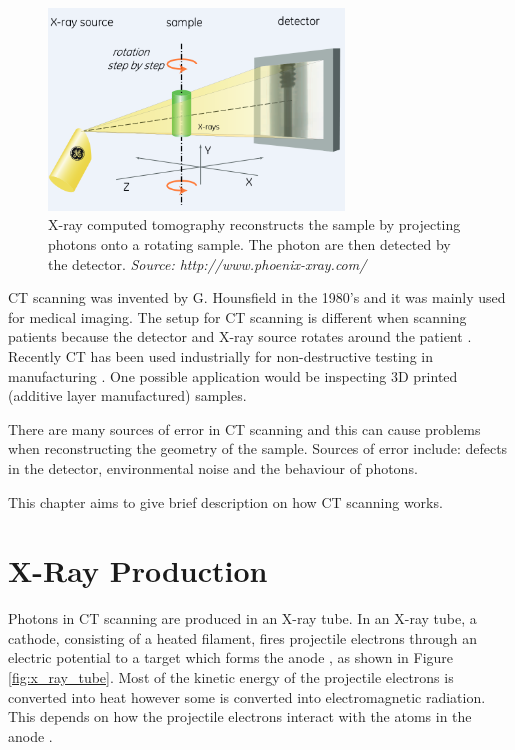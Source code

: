 \documentclass[12pt]{report}
\begin{document}
\begin{figure}
\centering
\includegraphics[width=0.7\textwidth]{figures/x_ray_ct.png}
\caption{X-ray computed tomography reconstructs the sample by projecting photons onto a rotating sample. The photon are then detected by the detector. \emph{Source: http://www.phoenix-xray.com/}}
\label{fig:x_ray_ct}
\end{figure}

CT scanning was invented by G. Hounsfield \cite{hounsfield1980computed} in the 1980's and it was mainly used for medical imaging. The setup for CT scanning is different when scanning patients because the detector and X-ray source rotates around the patient \cite{cantatore2011introduction}. Recently CT has been used industrially for non-destructive testing in manufacturing \cite{cantatore2011introduction}. One possible application would be inspecting 3D printed (additive layer manufactured) samples.

There are many sources of error in CT scanning \cite{cantatore2011introduction} and this can cause problems when reconstructing the geometry of the sample. Sources of error include: defects in the detector, environmental noise and the behaviour of photons.

This chapter aims to give brief description on how CT scanning works.

\section{X-Ray Production}
Photons in CT scanning are produced in an X-ray tube. In an X-ray tube, a cathode, consisting of a heated filament, fires projectile electrons through an electric potential to a target which forms the anode \cite{michael2001x}, as shown in Figure \ref{fig:x_ray_tube}. Most of the kinetic energy of the projectile electrons is converted into heat however some is converted into electromagnetic radiation. This depends on how the projectile electrons interact with the atoms in the anode \cite{cantatore2011introduction}.
\end{document}
